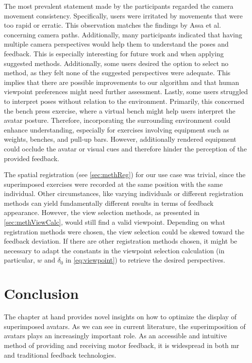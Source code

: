 The most prevalent statement made by the participants regarded the camera movement consistency. Specifically, users were irritated by movements that were too rapid or erratic. This observation matches the findings by Assa et al.~\cite{assa2008moh} concerning camera paths. Additionally, many participants indicated that having multiple camera perspectives would help them to understand the poses and feedback. This is especially interesting for future work and when applying suggested methods. Additionally, some users desired the option to select no method, as they felt none of the suggested perspectives were adequate. This implies that there are possible improvements to our algorithm and that human viewpoint preferences might need further assessment. Lastly, some users struggled to interpret poses without relation to the environment. Primarily, this concerned the bench press exercise, where a virtual bench might help users interpret the avatar posture. Therefore, incorporating the surrounding environment could enhance understanding, especially for exercises involving equipment such as weights, benches, and pull-up bars. However, additionally rendered equipment could occlude the avatar or visual cues and therefore hinder the perception of the provided feedback.

The spatial registration (see \autoref{sec:methReg}) for our use case was trivial, since the superimposed exercises were recorded at the same position with the same individual. Other circumstances, like varying individuals or different registration methods can yield fundamentally different results in terms of feedback appearance. However, the view selection methods, as presented in \autoref{sec:methViewCalc}, would still find a valid viewpoint. Depending on what registration methods were chosen, the view selection could be skewed toward the feedback deviation. If there are other registration methods chosen, it might be necessary to adapt the constants in the viewpoint selection calculation (in particular, $w$ and $\delta_0$ in \autoref{eq:viewpoint}) to retrieve the desired perspectives.

\section{Conclusion}
The chapter at hand provides novel insights on how to optimize the display of superimposed avatars. As we can see in current literature, the superimposition of avatars plays an increasingly important role. As an accessible and intuitive method of providing and receiving motor feedback, it is widespread in both \acrshort{mr} and traditional feedback technologies.

